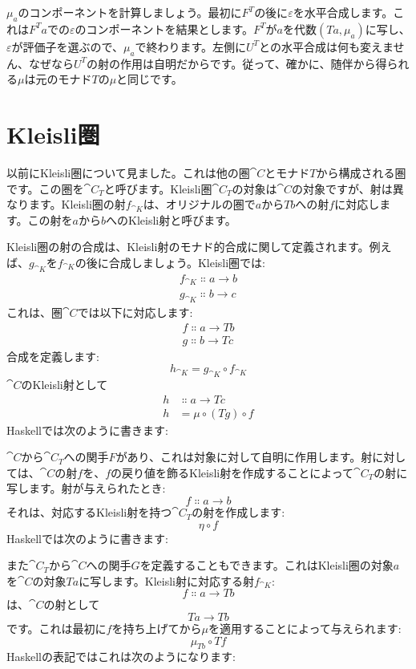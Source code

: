 $\mu_a$のコンポーネントを計算しましょう。最初に$F^T$の後に$\varepsilon$を水平合成します。これは$F^T a$での$\varepsilon$のコンポーネントを結果とします。$F^T$が$a$を代数$(T a, \mu_a)$に写し、$\varepsilon$が評価子を選ぶので、$\mu_a$で終わります。左側に$U^T$との水平合成は何も変えません、なぜなら$U^T$の射の作用は自明だからです。従って、確かに、随伴から得られる$\mu$は元のモナド$T$の$\mu$と同じです。

\section{Kleisli圏}

以前にKleisli圏について見ました。これは他の圏$\cat{C}$とモナド$T$から構成される圏です。この圏を$\cat{C}_T$と呼びます。Kleisli圏$\cat{C}_T$の対象は$\cat{C}$の対象ですが、射は異なります。Kleisli圏の射$f_{\cat{K}}$は、オリジナルの圏で$a$から$T b$への射$f$に対応します。この射を$a$から$b$へのKleisli射と呼びます。

Kleisli圏の射の合成は、Kleisli射のモナド的合成に関して定義されます。例えば、$g_{\cat{K}}$を$f_{\cat{K}}$の後に合成しましょう。Kleisli圏では: 
\begin{gather*}
  f_{\cat{K}} \Colon a \to b \\
  g_{\cat{K}} \Colon b \to c
\end{gather*}
これは、圏$\cat{C}$では以下に対応します: 
\begin{gather*}
  f \Colon a \to T b \\
  g \Colon b \to T c
\end{gather*}
合成を定義します: 
\[h_{\cat{K}} = g_{\cat{K}} \circ f_{\cat{K}}\]
$\cat{C}$のKleisli射として
\begin{align*}
  h & \Colon a \to T c          \\
  h & = \mu \circ (T g) \circ f
\end{align*}
Haskellでは次のように書きます: 

$\cat{C}$から$\cat{C}_T$への関手$F$があり、これは対象に対して自明に作用します。射に対しては、$\cat{C}$の射$f$を、$f$の戻り値を飾るKleisli射を作成することによって$\cat{C}_T$の射に写します。射が与えられたとき: 
\[f \Colon a \to b\]
それは、対応するKleisli射を持つ$\cat{C}_T$の射を作成します: 
\[\eta \circ f\]
Haskellでは次のように書きます: 

また$\cat{C}_T$から$\cat{C}$への関手$G$を定義することもできます。これはKleisli圏の対象$a$を$\cat{C}$の対象$T a$に写します。Kleisli射に対応する射$f_{\cat{K}}$: 
\[f \Colon a \to T b\]
は、$\cat{C}$の射として
\[T a \to T b\]
です。これは最初に$f$を持ち上げてから$\mu$を適用することによって与えられます: 
\[\mu_{T b} \circ T f\]
Haskellの表記ではこれは次のようになります: 

